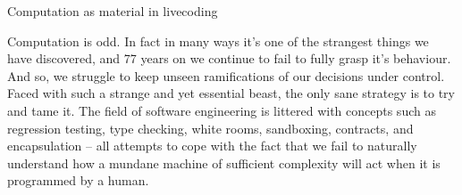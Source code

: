 \documentclass[letterpaper, 12pt]{article}
\begin{document}
{\cmjTitle 	Computation as material in livecoding}
\vspace*{24pt}


% 
% 
% 


\begin{abstract}
What does computation sound like, and how can process be integrated into livecoding practices along with code?
This paper gives insights into three years of artistic research and performance practice with Betablocker, an imaginary CPU architecture, specifically designed and implemented for livecoding purposes.
It covers the themes of algorithmic composition, sound generation, genetic programming and autonomous coding in the light of self-manipulating code and artistic research practice.
\end{abstract}

Computation is odd. 
In fact in many ways it's one of the strangest things we have discovered, and 77 years on we continue to fail to fully grasp it's behaviour.
And so, we struggle to keep unseen ramifications of our decisions under control. Faced with such a strange and yet essential beast, the only sane strategy is to try and tame it. 
The field of software engineering is littered with concepts such as regression testing, type checking, white rooms, sandboxing, contracts, and encapsulation -- all attempts to cope with the fact that we fail to naturally understand how a mundane machine of sufficient complexity will act when it is programmed by a human.
\end{document}
